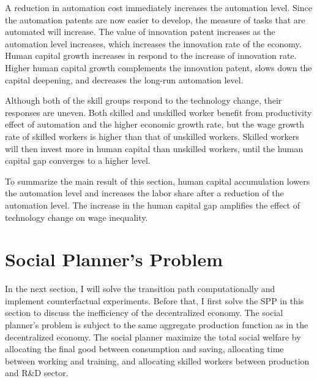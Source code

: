 \documentclass[12pt]{article}
\begin{document}
A reduction in automation cost immediately increases the automation level. Since the automation patents are now easier to develop, the measure of tasks that are automated will increase. The value of innovation patent increases as the automation level increases, which increases the innovation rate of the economy. Human capital growth increases in respond to the increase of innovation rate. Higher human capital growth complements the innovation patent, slows down the capital deepening, and decreases the long-run automation level. 

Although both of the skill groups respond to the technology change, their responses are uneven. Both skilled and unskilled worker benefit from productivity effect of automation and the higher economic growth rate, but the wage growth rate of skilled workers is higher than that of unskilled workers. Skilled workers will then invest more in human capital than unskilled workers, until the human capital gap converges to a higher level. 

To summarize the main result of this section, human capital accumulation lowers the automation level and increases the labor share after a reduction of the automation level. The increase in the human capital gap amplifies the effect of technology change on wage inequality. 

\section{Social Planner's Problem }
In the next section, I will solve the transition path computationally and implement counterfactual experiments. Before that, I first solve the SPP in this section to discuss the inefficiency of the decentralized economy. The social planner's problem is subject to the same aggregate production function as in the decentralized economy. The social planner maximize the total social welfare by allocating the final good between consumption and saving, allocating time between working and training, and allocating skilled workers between production and R\&D sector. 
\end{document}
